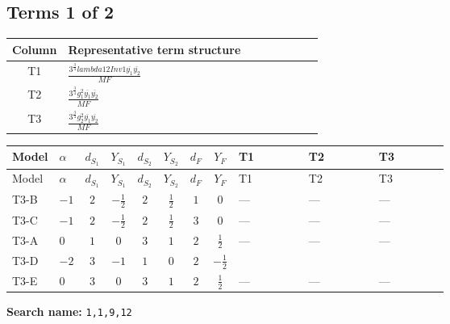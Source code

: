 \documentclass[8pt]{article}
\begin{document}
\begin{landscape}
\subsection*{Terms 1 of 2}
\begin{center}
\begin{tabular}{@{}c >{\raggedright\arraybackslash}p{0.82\linewidth}@{}}
\toprule
Column & Representative term structure \\
\midrule
T1 & \(\displaystyle \frac{3^{\frac{3}{4}} lambda12Inv1 \overline{y_{1}} \overline{y_{2}}}{MF}\) \\
\midrule
T2 & \(\displaystyle \frac{3^{\frac{3}{4}} g_{1}^{2} \overline{y_{1}} \overline{y_{2}}}{MF}\) \\
\midrule
T3 & \(\displaystyle \frac{3^{\frac{3}{4}} g_{2}^{2} \overline{y_{1}} \overline{y_{2}}}{MF}\) \\
\midrule
\bottomrule
\end{tabular}
\end{center}
\smallskip
\tiny
\begin{longtable}{@{}llcccccc >{\raggedright\arraybackslash}p{0.21\linewidth} >{\raggedright\arraybackslash}p{0.21\linewidth} >{\raggedright\arraybackslash}p{0.21\linewidth}@{}}
\toprule
Model & $\alpha$ & $d_{S_1}$ & $Y_{S_1}$ & $d_{S_2}$ & $Y_{S_2}$ & $d_F$ & $Y_F$ & T1 & T2 & T3 \\
\midrule
\endfirsthead
\toprule
Model & $\alpha$ & $d_{S_1}$ & $Y_{S_1}$ & $d_{S_2}$ & $Y_{S_2}$ & $d_F$ & $Y_F$ & T1 & T2 & T3 \\
\midrule
\endhead
T3-B & $-1$ & $2$ & $-\frac{1}{2}$ & $2$ & $\frac{1}{2}$ & $1$ & $0$ & --- & --- & --- \\
\midrule
T3-C & $-1$ & $2$ & $-\frac{1}{2}$ & $2$ & $\frac{1}{2}$ & $3$ & $0$ & --- & --- & --- \\
\midrule
T3-A & $0$ & $1$ & $0$ & $3$ & $1$ & $2$ & $\frac{1}{2}$ & --- & --- & --- \\
\midrule
T3-D & $-2$ & $3$ & $-1$ & $1$ & $0$ & $2$ & $-\frac{1}{2}$ & \scriptsize\adjustbox{max width=\linewidth}{$\begin{gathered} \frac{3^{\frac{3}{4}} lambda12Inv1 \overline{y_{1}} \overline{y_{2}}}{6 MF}\end{gathered}$} & \scriptsize\adjustbox{max width=\linewidth}{$\begin{gathered} \frac{3^{\frac{3}{4}} g_{1}^{2} \overline{y_{1}} \overline{y_{2}}}{8 MF}\end{gathered}$} & \scriptsize\adjustbox{max width=\linewidth}{$\begin{gathered} \frac{11 \cdot 3^{\frac{3}{4}} g_{2}^{2} \overline{y_{1}} \overline{y_{2}}}{8 MF}\end{gathered}$} \\
\midrule
T3-E & $0$ & $3$ & $0$ & $3$ & $1$ & $2$ & $\frac{1}{2}$ & --- & --- & --- \\
\midrule
\bottomrule
\end{longtable}
\clearpage
\noindent\textbf{Search name: }\texttt{1,1,9,12}\par\smallskip

\end{landscape}
\end{document}
